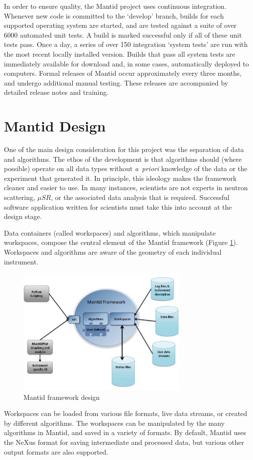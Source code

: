 \documentclass[1p]{elsarticle}
\begin{document}
In order to ensure quality, the Mantid project uses continuous integration. 
Whenever new code is committed to the `develop' branch, builds for each supported operating system are started, and are tested against a suite of over 6000 automated unit tests. A build is marked successful only if all of these unit tests pass.  
Once a day, a series of over 150 integration `system tests' are run with the most recent locally installed version. Builds that pass all system tests are immediately available for download and, in some cases, automatically deployed to computers. Formal releases of Mantid occur approximately every three months, and undergo additional manual testing. These releases are accompanied by detailed release notes and training. 


\section{Mantid Design}
One of the main design consideration for this project was the separation of data and algorithms. The ethos of the development is that algorithms should (where possible) operate on all data types without \textit{a\ priori} knowledge of the data or the experiment that generated it. In principle, this ideology makes the framework cleaner and easier to use. In many instances, scientists are not experts in neutron scattering, $\mu SR$, or the associated data analysis that is required. Successful software application written for scientists must take this into account at the design stage.

Data containers (called workspaces) and algorithms, which manipulate workspaces, compose the central element of the Mantid framework (Figure \ref{fig:Framework}). 
Workspaces and algorithms are aware of the geometry of each individual instrument. 
\begin{figure}[!ht]
\centerline{\includegraphics[width=0.75\textwidth]{MantidFramework.pdf}}
\caption{Mantid framework design}
\label{fig:Framework}
\end{figure}
Workspaces can be loaded from various file formats, live data streams, or created by different algorithms. The workspaces can be manipulated by the many algorithms in Mantid, and saved in a variety of formats. By default, Mantid uses the NeXus format\cite{NeXus} for saving intermediate and processed data, but various other output formats are also supported.
\end{document}
